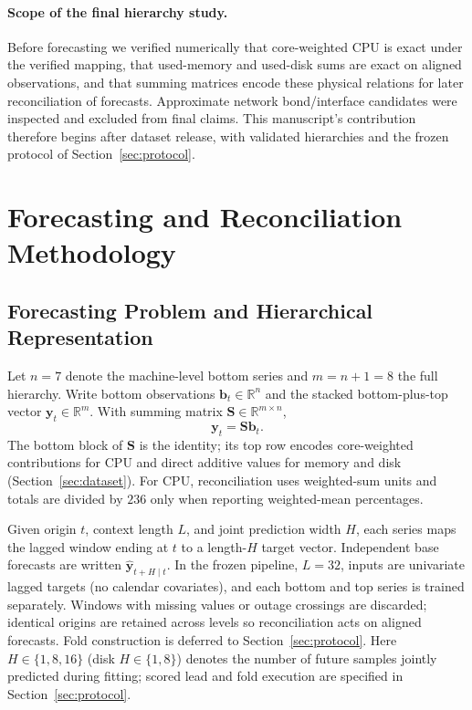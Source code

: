 \documentclass[a4paper,fleqn]{cas-dc}
\begin{document}
\paragraph{Scope of the final hierarchy study.}
Before forecasting we verified numerically that core-weighted {CPU} is exact
under the verified mapping, that used-memory and used-disk sums are exact on
aligned observations, and that summing matrices encode these physical relations
for later reconciliation of forecasts.
Approximate network bond/interface candidates were inspected and excluded from
final claims.
This manuscript's contribution therefore begins after dataset release, with
validated hierarchies and the frozen protocol of Section~\ref{sec:protocol}.



\section{Forecasting and Reconciliation Methodology}
\label{sec:methods}

\subsection{Forecasting Problem and Hierarchical Representation}
\label{sec:forecast-problem}
Let $n=7$ denote the machine-level bottom series and $m=n+1=8$ the full
hierarchy.
Write bottom observations $\mathbf{b}_t\in\mathbb{R}^{n}$ and the stacked
bottom-plus-top vector $\mathbf{y}_t\in\mathbb{R}^{m}$.
With summing matrix $\mathbf{S}\in\mathbb{R}^{m\times n}$,
\begin{equation}
\mathbf{y}_t=\mathbf{S}\mathbf{b}_t.
\label{eq:hierarchy}
\end{equation}
The bottom block of $\mathbf{S}$ is the identity; its top row encodes
core-weighted contributions for {CPU} and direct additive values for memory and
disk (Section~\ref{sec:dataset}).
For {CPU}, reconciliation uses weighted-sum units and totals are divided by
$236$ only when reporting weighted-mean percentages.

Given origin $t$, context length $L$, and joint prediction width $H$, each series
maps the lagged window ending at $t$ to a length-$H$ target vector.
Independent base forecasts are written $\hat{\mathbf{y}}_{t+H\mid t}$.
In the frozen pipeline, $L=32$, inputs are univariate lagged targets (no
calendar covariates), and each bottom and top series is trained separately.
Windows with missing values or outage crossings are discarded; identical
origins are retained across levels so reconciliation acts on aligned forecasts.
Fold construction is deferred to Section~\ref{sec:protocol}.
Here $H\in\{1,8,16\}$ (disk $H\in\{1,8\}$) denotes the number of future samples
jointly predicted during fitting; scored lead and fold execution are specified
in Section~\ref{sec:protocol}.
\end{document}
